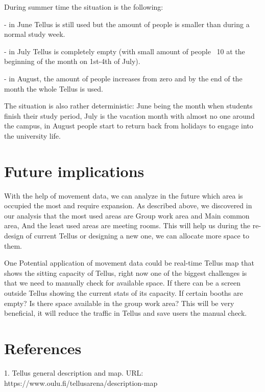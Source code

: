 \documentclass{article}
\begin{document}
During summer time the situation is the following:

- in June Tellus is still used but the amount of people is smaller than during a normal study week.

- in July Tellus is completely empty (with small amount of people ~10 at the beginning of the month
on 1st-4th of July).

- in August, the amount of people increases from zero and by the end of the month the whole Tellus
is used.

The situation is also rather deterministic: June being the month when students finish their study
period, July is the vacation month with almost no one around the campus, in August people start to
return back from holidays to engage into the university life.

\section{Future implications}

With the help of movement data, we can analyze in the future which area is occupied the most and
require expansion. As described above, we discovered in our analysis that the most used areas are
Group work area and Main common area, And the least used areas are meeting rooms. This will help us
during the re-design of current Tellus or designing a new one, we can allocate more space to them.

One Potential application of movement data could be real-time Tellus map that shows the sitting
capacity of Tellus, right now one of the biggest challenges is that we need to manually check for
available space. If there can be a screen outside Tellus showing the current stats of its capacity.
If certain booths are empty? Is there space available in the group work area? This will be very
beneficial, it will reduce the traffic in Tellus and save users the manual check.


\section{References}

1. Tellus general description and map. URL: https://www.oulu.fi/tellusarena/description-map
\end{document}
